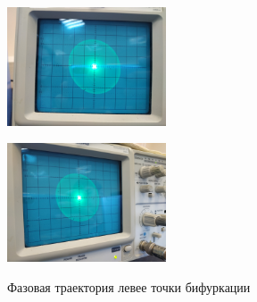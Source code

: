 \begin{center}
    \begin{figure}[H]
        \begin{minipage}{0.49\linewidth}
            \centering
            \includegraphics[height=100pt]{img/2.jpg} 
            \vspace{0pt}
            \label{fig:10}
        \end{minipage}
        \begin{minipage}{0.49\linewidth}
            \centering
            \includegraphics[height=100pt]{img/1.jpg} 
            \vspace{0pt}
            \label{fig:11}
        \end{minipage}

    \caption{Фазовая траектория левее точки бифуркации}
    \vspace{-40pt}
    \end{figure}
\end{center} 

